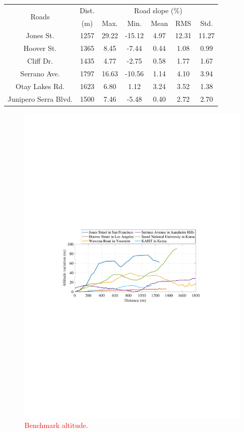 \documentclass[onecolumn]{IEEEconf}
\begin{document}
\begin{description}
\begin{table} [h!]
\centering
\label{table:road_bench}
\begin{tabular}{|c|c|c|c|c|c|c|}  \hline
\multirow{2}{*}{Roads} 
				&Dist.		&\multicolumn{5}{|c|}{Road slope (\%)}  \\ \cline{3-7}
				&(m)		 	&Max.		&Min. 	&Mean		&RMS 	&Std.	\\ \hline
Jones St. 	&1257		&29.22		&-15.12	&4.97 		&12.31 	&11.27	\\ \hline
Hoover St. 	&1365		&8.45		&-7.44	&0.44		&1.08 	&0.99	\\ \hline
Cliff Dr. 	&1435		&4.77		&-2.75	&0.58		&1.77 	&1.67	\\ \hline
Serrano Ave.		&1797		&16.63		&-10.56	&1.14 		&4.10 	&3.94	\\ \hline
Otay Lakes Rd.		&1623		&6.80		&1.12	&3.24		&3.52 	&1.38	\\ \hline
Junipero Serra Blvd.	&1500		&7.46		&-5.48	&0.40		&2.72 	&2.70	\\ \hline
\end{tabular}
\end{table}


\begin{figure} [h!]	 %
\centering
\renewcommand\thefigure{8}
\includegraphics[width=0.7\hsize]{Figures/Benchmark_altitude.pdf}
\caption{\textcolor{red}{Benchmark altitude.}}
\label{fig:bench_altitude}
\end{figure} 


\end{description}
\end{document}
